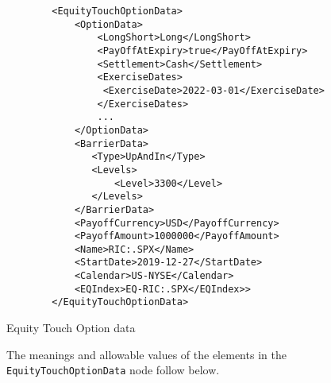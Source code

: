\begin{listing}[H]
\begin{verbatim}
        <EquityTouchOptionData>
            <OptionData>
                <LongShort>Long</LongShort>
                <PayOffAtExpiry>true</PayOffAtExpiry>
                <Settlement>Cash</Settlement>
                <ExerciseDates>
                 <ExerciseDate>2022-03-01</ExerciseDate>
                </ExerciseDates>                                
                ...
            </OptionData>
            <BarrierData>
               <Type>UpAndIn</Type>
               <Levels>
                   <Level>3300</Level>
               </Levels>
            </BarrierData>
            <PayoffCurrency>USD</PayoffCurrency>
            <PayoffAmount>1000000</PayoffAmount>
            <Name>RIC:.SPX</Name>
            <StartDate>2019-12-27</StartDate>
            <Calendar>US-NYSE</Calendar>
            <EQIndex>EQ-RIC:.SPX</EQIndex>>
        </EquityTouchOptionData>
\end{verbatim}
\caption{Equity Touch Option data}
\label{lst:eqtouchoption_data}
\end{listing}

The meanings and allowable values of the elements in the \lstinline!EquityTouchOptionData!  node follow below.

